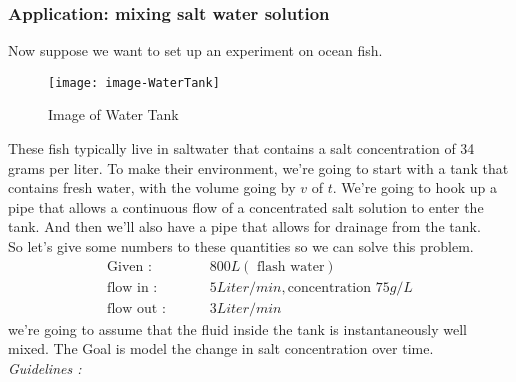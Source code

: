 \subsubsection{Application: mixing salt water solution} 
Now suppose we want to set up an experiment on ocean fish.
\begin{figure}[ht!]
  \centering
  \texttt{[image: image-WaterTank]}
  \caption{Image of Water Tank}
  \label{fig:tank}
\end{figure}
These fish typically live in saltwater that contains a salt concentration of 34 grams per liter.
To make their environment, we're going to start with a tank that contains fresh water, with the volume going by $v$ of $t$.
We're going to hook up a pipe that allows a continuous flow of a concentrated salt solution
to enter the tank.
And then we'll also have a pipe that allows for drainage from the tank. \\
So let's give some numbers to these quantities so we can solve this problem.
\begin{align*}
  \text{Given : } &\qquad 800L (\text{ flash water}) \\
  \text{flow in : } &\qquad 5 Liter/min , \text{concentration } 75 g/L \\
  \text{flow out : } &\qquad 3 Liter/min 
\end{align*}
we're going to assume that the fluid inside the tank is instantaneously well mixed.
The Goal is model the change in salt concentration over time.\\
\emph{Guidelines :}
